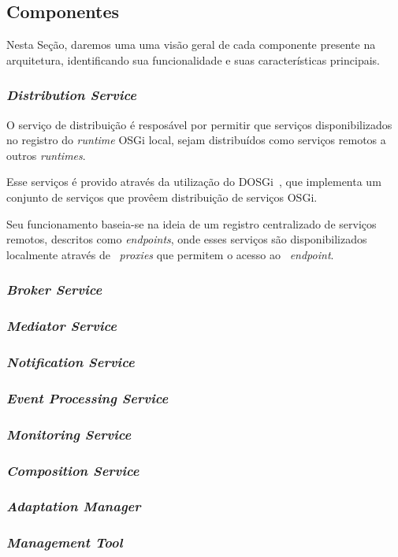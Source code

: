 \subsection{Componentes}
Nesta Seção, daremos uma uma visão geral de cada componente presente na arquitetura, identificando sua funcionalidade e suas características principais.

\subsubsection{\textit{Distribution Service}}
O serviço de distribuição é resposável por permitir que serviços disponibilizados no registro do \textit{runtime} OSGi local, sejam distribuídos como serviços remotos a outros \textit{runtimes}.

Esse serviços é provido através da utilização do DOSGi~\cite{dosgi}, que implementa um conjunto de serviços que provêem distribuição de serviços OSGi. 

Seu funcionamento baseia-se na ideia de um registro centralizado de serviços remotos, descritos como \textit{endpoints}, onde esses serviços são disponibilizados localmente através de ~\textit{proxies} que permitem o acesso ao ~\textit{endpoint}.

\subsubsection{\textit{Broker Service}}

\subsubsection{\textit{Mediator Service}}

\subsubsection{\textit{Notification Service}}

\subsubsection{\textit{Event Processing Service}}
\label{subsec:cep}

\subsubsection{\textit{Monitoring Service}}
\label{subsec:monit_serv}

\subsubsection{\textit{Composition Service}}

\subsubsection{\textit{Adaptation Manager}}

\subsubsection{\textit{Management Tool}}

